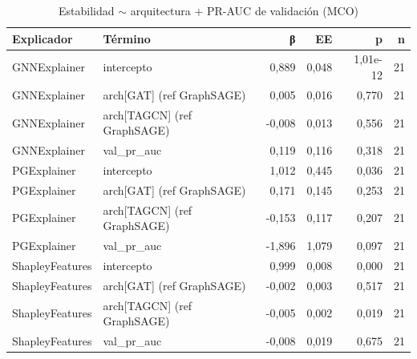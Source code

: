 \begin{table}[htbp]
\centering\small
\caption{Estabilidad $\sim$ arquitectura + PR-AUC de validación (MCO)}
\label{tab:v4-regresion}
\begin{tabular}{llrrrr}
\toprule
Explicador & Término & β & EE & p & n \\
\midrule
GNNExplainer & intercepto & 0,889 & 0,048 & 1,01e-12 & 21 \\
GNNExplainer & arch[GAT] (ref GraphSAGE) & 0,005 & 0,016 & 0,770 & 21 \\
GNNExplainer & arch[TAGCN] (ref GraphSAGE) & -0,008 & 0,013 & 0,556 & 21 \\
GNNExplainer & val\_pr\_auc & 0,119 & 0,116 & 0,318 & 21 \\
PGExplainer & intercepto & 1,012 & 0,445 & 0,036 & 21 \\
PGExplainer & arch[GAT] (ref GraphSAGE) & 0,171 & 0,145 & 0,253 & 21 \\
PGExplainer & arch[TAGCN] (ref GraphSAGE) & -0,153 & 0,117 & 0,207 & 21 \\
PGExplainer & val\_pr\_auc & -1,896 & 1,079 & 0,097 & 21 \\
ShapleyFeatures & intercepto & 0,999 & 0,008 & 0,000 & 21 \\
ShapleyFeatures & arch[GAT] (ref GraphSAGE) & -0,002 & 0,003 & 0,517 & 21 \\
ShapleyFeatures & arch[TAGCN] (ref GraphSAGE) & -0,005 & 0,002 & 0,019 & 21 \\
ShapleyFeatures & val\_pr\_auc & -0,008 & 0,019 & 0,675 & 21 \\
\bottomrule
\end{tabular}
\end{table}
